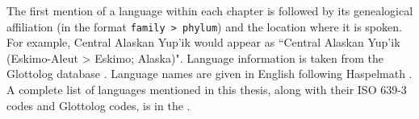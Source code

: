The first mention of a language within each chapter is followed by its genealogical affiliation (in the format \texttt{family > phylum})  and the location where it is spoken. For example, Central Alaskan Yup'ik would appear as ``Central Alaskan Yup'ik (Eskimo-Aleut > Eskimo; Alaska)".  Language information is taken from the Glottolog database . Language names are given in English following Haspelmath . A complete list of languages mentioned in this thesis, along with their ISO 639-3 codes and Glottolog codes, is in the . 
